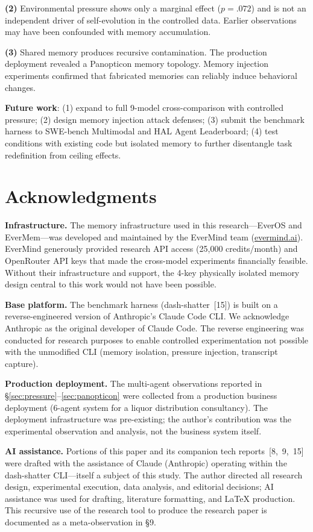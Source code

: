 \documentclass[11pt, a4paper]{article}
\begin{document}
\textbf{(2)} Environmental pressure shows only a marginal effect ($p=.072$) and is not an independent driver of self-evolution in the controlled data. Earlier observations may have been confounded with memory accumulation.

\textbf{(3)} Shared memory produces recursive contamination. The production deployment revealed a Panopticon memory topology. Memory injection experiments confirmed that fabricated memories can reliably induce behavioral changes.

\textbf{Future work}: (1) expand to full 9-model cross-comparison with controlled pressure; (2) design memory injection attack defenses; (3) submit the benchmark harness to SWE-bench Multimodal and HAL Agent Leaderboard; (4) test conditions with existing code but isolated memory to further disentangle task redefinition from ceiling effects.

\section*{Acknowledgments}

\textbf{Infrastructure.} The memory infrastructure used in this research---EverOS and EverMem---was developed and maintained by the EverMind team (\url{evermind.ai}). EverMind generously provided research API access (25,000 credits/month) and OpenRouter API keys that made the cross-model experiments financially feasible. Without their infrastructure and support, the 4-key physically isolated memory design central to this work would not have been possible.

\textbf{Base platform.} The benchmark harness (dash-shatter~[15]) is built on a reverse-engineered version of Anthropic's Claude Code CLI. We acknowledge Anthropic as the original developer of Claude Code. The reverse engineering was conducted for research purposes to enable controlled experimentation not possible with the unmodified CLI (memory isolation, pressure injection, transcript capture).

\textbf{Production deployment.} The multi-agent observations reported in \S\ref{sec:pressure}--\ref{sec:panopticon} were collected from a production business deployment (6-agent system for a liquor distribution consultancy). The deployment infrastructure was pre-existing; the author's contribution was the experimental observation and analysis, not the business system itself.

\textbf{AI assistance.} Portions of this paper and its companion tech reports~[8,~9,~15] were drafted with the assistance of Claude (Anthropic) operating within the dash-shatter CLI---itself a subject of this study. The author directed all research design, experimental execution, data analysis, and editorial decisions; AI assistance was used for drafting, literature formatting, and LaTeX production. This recursive use of the research tool to produce the research paper is documented as a meta-observation in \S9.
\end{document}

